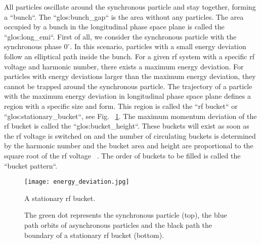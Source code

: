 All particles oscillate around the synchronous particle and stay together, forming a ``bunch``. The ``\gls{glos:bunch_gap}`` is the area without any particles. The area occupied by a bunch in the longitudinal phase space plane is called the ``\gls{glos:long_emi}``. First of all, we consider the synchronous particle with the synchronous phase $0^\circ$. In this scenario, particles with a small energy deviation follow an elliptical path inside the bunch. For a given rf system with a specific rf voltage and harmonic number, there exists a maximum energy deviation. For particles with energy deviations larger than the maximum energy deviation, they cannot be trapped around the synchronous particle. The trajectory of a particle with the maximum energy deviation in longitudinal phase space plane defines a region with a specific size and form. This region is called the ``rf bucket`` or ``\gls{glos:stationary_bucket}``, see Fig. ~\ref{energy_deviation}. The maximum momentum deviation of the rf bucket is called the ``\gls{glos:bucket_height}``. These buckets will exist as soon as the rf voltage is switched on and the number of circulating buckets is determined by the harmonic number and the bucket area and height are proportional to the square root of the rf voltage ~\cite{lee_accelerator_2011}. The order of buckets to be filled is called the ``bucket pattern``.
\begin{figure}[!htb]
   \centering   
   \texttt{[image: energy\_deviation.jpg]}
   \caption{A stationary rf bucket.}
	\caption*{The green dot represents the synchronous particle (top), the blue path orbits of asynchronous particles and the black path the boundary of a stationary rf bucket (bottom).}
   \label{energy_deviation}
\end{figure} 

